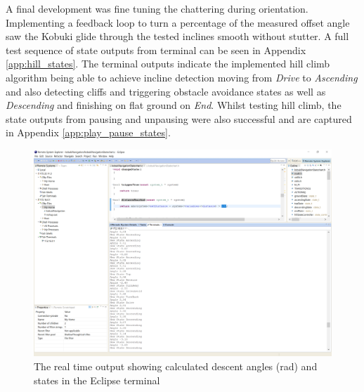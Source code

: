 A final development was fine tuning the chattering during orientation. Implementing a feedback loop to turn a percentage of the measured offset angle saw the Kobuki glide through the tested inclines smooth without stutter. A full test sequence of state outputs from terminal can be seen in Appendix \ref{app:hill_states}. The terminal outputs indicate the implemented hill climb algorithm being able to achieve incline detection moving from \textit{Drive} to \textit{Ascending} and also detecting cliffs and triggering obstacle avoidance states as well as \textit{Descending} and finishing on flat ground on \textit{End}. Whilst testing hill climb, the state outputs from pausing and unpausing were also successful and are captured in Appendix \ref{app:play_pause_states}.
\begin{figure}[H]
    \centering
    \includegraphics[width=15cm]{Images/eclipse_screenshot.PNG}
    \caption{The real time output showing calculated descent angles (rad) and states in the Eclipse terminal}
    \label{fig:eclipse_output}
\end{figure}